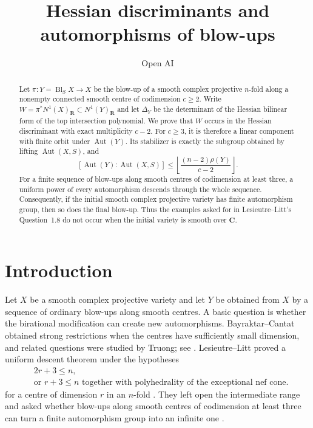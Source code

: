 \documentclass[11pt,reqno]{amsart}
\title[Hessian discriminants and blow-ups]{Hessian discriminants and automorphisms of blow-ups}
\author{Open AI}
\date{}
\newcommand{\R}{\mathbf R}
\newcommand{\C}{\mathbf C}
\DeclareMathOperator{\Aut}{Aut}
\DeclareMathOperator{\Bl}{Bl}
\theoremstyle{remark}
\begin{document}
\begin{abstract}
Let $\pi\colon Y=\Bl_S X\to X$ be the blow-up of a smooth complex projective $n$-fold along a nonempty connected smooth centre of codimension $c\ge2$.  Write $W=\pi^*N^1(X)_{\R}\subset N^1(Y)_{\R}$ and let $\Delta_Y$ be the determinant of the Hessian bilinear form of the top intersection polynomial.  We prove that $W$ occurs in the Hessian discriminant with exact multiplicity $c-2$.  For $c\ge3$, it is therefore a linear component with finite orbit under $\Aut(Y)$.  Its stabilizer is exactly the subgroup obtained by lifting $\Aut(X,S)$, and
\[
 [\Aut(Y):\Aut(X,S)]
 \le
 \left\lfloor\frac{(n-2)\rho(Y)}{c-2}\right\rfloor.
\]
For a finite sequence of blow-ups along smooth centres of codimension at least three, a uniform power of every automorphism descends through the whole sequence.  Consequently, if the initial smooth complex projective variety has finite automorphism group, then so does the final blow-up.  Thus the examples asked for in Lesieutre--Litt's Question~1.8 do not occur when the initial variety is smooth over $\C$.
\end{abstract}

\maketitle

\section{Introduction}

Let $X$ be a smooth complex projective variety and let $Y$ be obtained from $X$ by a sequence of ordinary blow-ups along smooth centres.  A basic question is whether the birational modification can create new automorphisms.  Bayraktar--Cantat obtained strong restrictions when the centres have sufficiently small dimension, and related questions were studied by Truong; see \cite{BayraktarCantat2013,Truong2013}.  Lesieutre--Litt proved a uniform descent theorem under the hypotheses
\[
\begin{aligned}
&2r+3\le n,\\
&\text{or } r+3\le n\text{ together with polyhedrality of the exceptional nef cone}.
\end{aligned}
\]
for a centre of dimension $r$ in an $n$-fold \cite[Theorem~1.6]{LesieutreLitt2019}.  They left open the intermediate range and asked whether blow-ups along smooth centres of codimension at least three can turn a finite automorphism group into an infinite one \cite[Question~1.8]{LesieutreLitt2019}.
\end{document}
